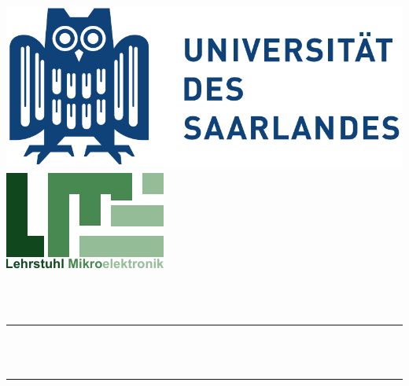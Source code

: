
\begin{titlepage}
	\centering
	\vspace*{-2.0 cm}
	\includegraphics[scale = 0.5]{inc/img/title/uds.pdf}\hspace{15em}
	\includegraphics[scale = 1.25]{inc/img/title/lme.pdf}
	\vfill
	\vfill
	\begin{singlespace}
	\textsc{\LARGE \tUniversity} \\ [0.5 cm]
	\textsc{\LARGE \tChair} \\ [0.5 cm]
	\textsc{\LARGE \tProfessor}
	\end{singlespace}
	\vfill
	\vfill
	\rule{\linewidth}{0.2 mm} \\[0.5 cm]
	\doublespacing{ \huge \textbf \tTitle } \\
	\rule{\linewidth}{0.2 mm}
	\vfill
	\vfill
	\textsc{\huge \tType} \\ [0.5 cm]
	{\LARGE \tDescA} \\
	{\LARGE \tDescB} \\
	{\LARGE \tDescC} \\
	{\LARGE \tDescD}
	\vfill
	\vfill
	{\LARGE \tStudent}
	\vfill
	\vfill
	{\large \textbf{\tSupervisorTitle}} \\
	{\large \tProfessor} \\
	{\large \tAssistant}
	\vfill
	\vfill
	{\large \tDate}
\end{titlepage}
